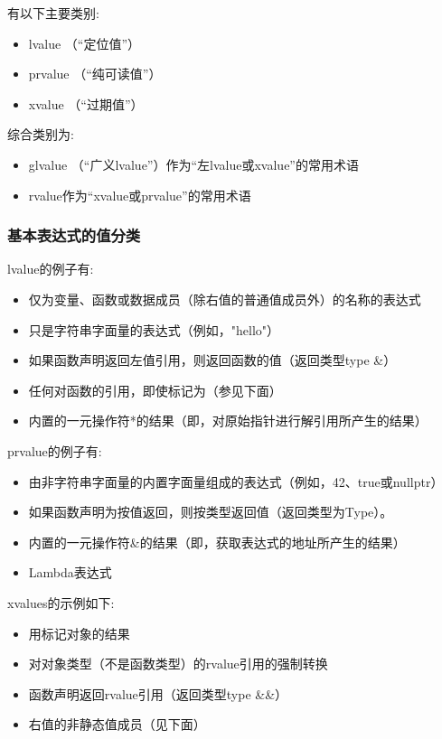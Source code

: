 有以下主要类别:

\begin{itemize}
	\item lvalue （“定位值”）
	\item prvalue （“纯可读值”）
	\item xvalue （“过期值”）
\end{itemize}

综合类别为:

\begin{itemize}
	\item glvalue （“广义lvalue”）作为“左lvalue或xvalue”的常用术语
	\item rvalue作为“xvalue或prvalue”的常用术语
\end{itemize}

\subsubsection{基本表达式的值分类}

lvalue的例子有:

\begin{itemize}
	\item 仅为变量、函数或数据成员（除右值的普通值成员外）的名称的表达式
	\item 只是字符串字面量的表达式（例如，"hello"）
	\item 如果函数声明返回左值引用，则返回函数的值（返回类型type \&）
	\item 任何对函数的引用，即使标记为（参见下面）
	\item 内置的一元操作符*的结果（即，对原始指针进行解引用所产生的结果）
\end{itemize}

prvalue的例子有:

\begin{itemize}
	\item 由非字符串字面量的内置字面量组成的表达式（例如，42、true或nullptr）
	\item 如果函数声明为按值返回，则按类型返回值（返回类型为Type）。
	\item 内置的一元操作符\&的结果（即，获取表达式的地址所产生的结果）
	\item Lambda表达式
\end{itemize}

xvalues的示例如下:

\begin{itemize}
	\item 用标记对象的结果
	\item 对对象类型（不是函数类型）的rvalue引用的强制转换
	\item 函数声明返回rvalue引用（返回类型type \&\&）
	\item 右值的非静态值成员（见下面）
\end{itemize}

